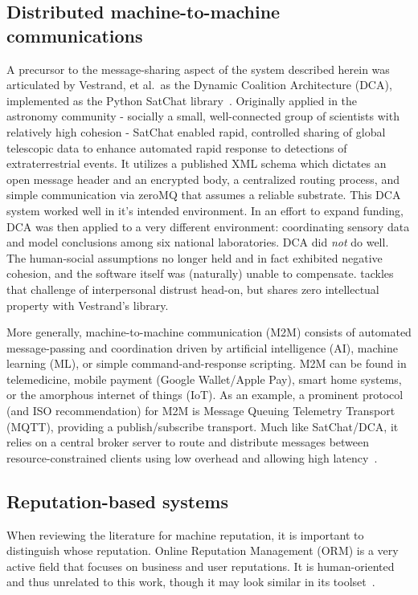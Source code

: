 \subsection{Distributed machine-to-machine communications}\label{subsec:m2m}

A precursor to the message-sharing aspect of the system described herein was articulated by Vestrand, et al.\ as the Dynamic Coalition Architecture (DCA), implemented as the Python SatChat library~\cite{vestrand2021artificial}.
Originally applied in the astronomy community - socially a small, well-connected group of scientists with relatively high cohesion - SatChat enabled rapid, controlled sharing of global telescopic data to enhance automated rapid response to detections of extraterrestrial events.
It utilizes a published XML schema which dictates an open message header and an encrypted body, a centralized routing process, and simple communication via zeroMQ that assumes a reliable substrate.
This DCA system worked well in it's intended environment.
In an effort to expand funding, DCA was then applied to a very different environment: coordinating sensory data and model conclusions among six national laboratories.
DCA did \textit{not} do well.
The human-social assumptions no longer held and in fact exhibited negative cohesion, and the software itself was (naturally) unable to compensate. \projectName tackles that challenge of interpersonal distrust head-on, but shares zero intellectual property with Vestrand's library.

More generally, machine-to-machine communication (M2M) consists of automated message-passing and coordination driven by artificial intelligence (AI), machine learning (ML), or simple command-and-response scripting.
M2M can be found in telemedicine, mobile payment (Google Wallet/Apple Pay), smart home systems, or the amorphous internet of things (IoT). As an example, a prominent protocol (and ISO recommendation) for M2M is Message Queuing Telemetry Transport (MQTT), providing a publish/subscribe transport.
Much like SatChat/DCA, it relies on a central broker server to route and distribute messages between resource-constrained clients using low overhead and allowing high latency~\cite{oasis2019mqtt}.


\subsection{Reputation-based systems}\label{subsec:reputation}

When reviewing the literature for machine reputation, it is important to distinguish whose reputation.
Online Reputation Management (ORM) is a very active field that focuses on business and user reputations.
It is human-oriented and thus unrelated to this work, though it may look similar in its toolset~\cite{hasan2022privacy}.

